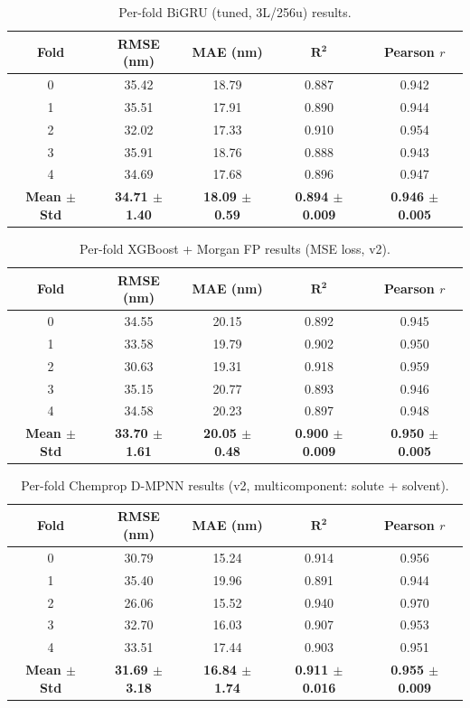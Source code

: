 \documentclass[11pt,a4paper]{article}
\begin{document}
\begin{table}[H]
\centering
\caption{Per-fold BiGRU (tuned, 3L/256u) results.}
\label{tab:perfold_bigru_tuned}
\begin{tabular}{ccccc}
\toprule
\textbf{Fold} & \textbf{RMSE (nm)} & \textbf{MAE (nm)} & $\boldsymbol{R^2}$ & \textbf{Pearson $r$} \\
\midrule
0 & 35.42 & 18.79 & 0.887 & 0.942 \\
1 & 35.51 & 17.91 & 0.890 & 0.944 \\
2 & 32.02 & 17.33 & 0.910 & 0.954 \\
3 & 35.91 & 18.76 & 0.888 & 0.943 \\
4 & 34.69 & 17.68 & 0.896 & 0.947 \\
\midrule
\textbf{Mean $\pm$ Std} & \textbf{34.71 $\pm$ 1.40} & \textbf{18.09 $\pm$ 0.59} & \textbf{0.894 $\pm$ 0.009} & \textbf{0.946 $\pm$ 0.005} \\
\bottomrule
\end{tabular}
\end{table}

\begin{table}[H]
\centering
\caption{Per-fold XGBoost + Morgan FP results (MSE loss, v2).}
\label{tab:perfold_xgboost}
\begin{tabular}{ccccc}
\toprule
\textbf{Fold} & \textbf{RMSE (nm)} & \textbf{MAE (nm)} & $\boldsymbol{R^2}$ & \textbf{Pearson $r$} \\
\midrule
0 & 34.55 & 20.15 & 0.892 & 0.945 \\
1 & 33.58 & 19.79 & 0.902 & 0.950 \\
2 & 30.63 & 19.31 & 0.918 & 0.959 \\
3 & 35.15 & 20.77 & 0.893 & 0.946 \\
4 & 34.58 & 20.23 & 0.897 & 0.948 \\
\midrule
\textbf{Mean $\pm$ Std} & \textbf{33.70 $\pm$ 1.61} & \textbf{20.05 $\pm$ 0.48} & \textbf{0.900 $\pm$ 0.009} & \textbf{0.950 $\pm$ 0.005} \\
\bottomrule
\end{tabular}
\end{table}

\begin{table}[H]
\centering
\caption{Per-fold Chemprop D-MPNN results (v2, multicomponent: solute + solvent).}
\label{tab:perfold_chemprop}
\begin{tabular}{ccccc}
\toprule
\textbf{Fold} & \textbf{RMSE (nm)} & \textbf{MAE (nm)} & $\boldsymbol{R^2}$ & \textbf{Pearson $r$} \\
\midrule
0 & 30.79 & 15.24 & 0.914 & 0.956 \\
1 & 35.40 & 19.96 & 0.891 & 0.944 \\
2 & 26.06 & 15.52 & 0.940 & 0.970 \\
3 & 32.70 & 16.03 & 0.907 & 0.953 \\
4 & 33.51 & 17.44 & 0.903 & 0.951 \\
\midrule
\textbf{Mean $\pm$ Std} & \textbf{31.69 $\pm$ 3.18} & \textbf{16.84 $\pm$ 1.74} & \textbf{0.911 $\pm$ 0.016} & \textbf{0.955 $\pm$ 0.009} \\
\bottomrule
\end{tabular}
\end{table}
\end{document}
